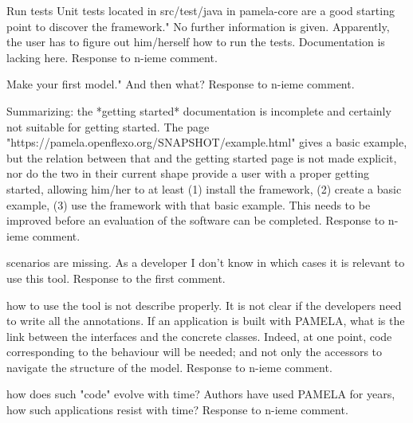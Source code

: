 \documentclass[10pt]{article}
\begin{document}
\begin{response}{Run tests Unit tests located in src/test/java in pamela-core are a good starting point to discover the framework." No further information is given. Apparently, the user has to figure out him/herself how to run the tests. Documentation is lacking here.
}
  Response to n-ieme comment.
\end{response}

\begin{response}{Make your first model." And then what?
}
  Response to n-ieme comment.
\end{response}

\begin{response}{Summarizing: the *getting started* documentation is incomplete and certainly not suitable for getting started. The page "https://pamela.openflexo.org/SNAPSHOT/example.html" gives a basic example, but the relation between that and the getting started page is not made explicit, nor do the two in their current shape provide a user with a proper getting started, allowing him/her to at least (1) install the framework, (2) create a basic example, (3) use the framework with that basic example. This needs to be improved before an evaluation of the software can be completed.
}
  Response to n-ieme comment.
\end{response}


\pagebreak

\begin{response}{scenarios are missing. As a developer I don't know in which cases it is relevant to use this tool.}
  Response to the first comment.
\end{response}


\begin{response}{how to use the tool is not describe properly. It is not clear if the developers need to write all the annotations. If an application is built with PAMELA, what is the link between the interfaces and the concrete classes. Indeed, at one point, code corresponding to the behaviour will be needed; and not only the accessors to navigate the structure of the model.}
  Response to n-ieme comment.
\end{response}

\begin{response}{how does such "code" evolve with time? Authors have used PAMELA for years, how such applications resist with time?}
  Response to n-ieme comment.
\end{response}
\end{document}
